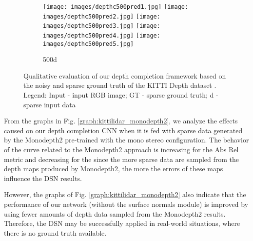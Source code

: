 \documentclass[5p]{elsarticle}
\begin{document}
\begin{figure}[]
\begin{subfigure}[t]{0.11\textwidth}
         \centering
         \caption{500d}
         \texttt{[image: images/depthc500pred1.jpg]}
         \hspace{1em}
         \texttt{[image: images/depthc500pred2.jpg]}
         \hspace{1em}
         \texttt{[image: images/depthc500pred3.jpg]}
         \hspace{1em}
         \texttt{[image: images/depthc500pred4.jpg]}
         \hspace{1em}
         \texttt{[image: images/depthc500pred5.jpg]}
         \label{kittilidarsubfig0:500}
     \end{subfigure}
     \caption{Qualitative evaluation of our depth completion framework based on the noisy and sparse ground truth of the KITTI Depth dataset \cite{uhrig2017sparsity}. Legend: Input - input RGB image; GT - sparse ground truth; d - sparse input data} 
     \label{kittilidarsubfig0:all}
\end{figure}

From the graphs in Fig. \ref{graph:kittilidar_monodepth2}, we analyze the effects caused on our depth completion CNN when it is fed with sparse data generated by the Monodepth2 pre-trained with the mono  stereo configuration. The behavior of the curve related to the Monodepth2 approach is increasing for the Abs Rel metric and decreasing for the   since the more sparse data are sampled from the depth maps produced by Monodepth2, the more the errors of these maps influence the DSN results. 

However, the graphs of Fig. \ref{graph:kittilidar_monodepth2} also indicate that the performance of our network (without the surface normals module) is improved by using fewer amounts of depth data sampled from the Monodepth2 results. Therefore, the DSN may be successfully applied in real-world situations, where there is no ground truth available. 
\end{document}
